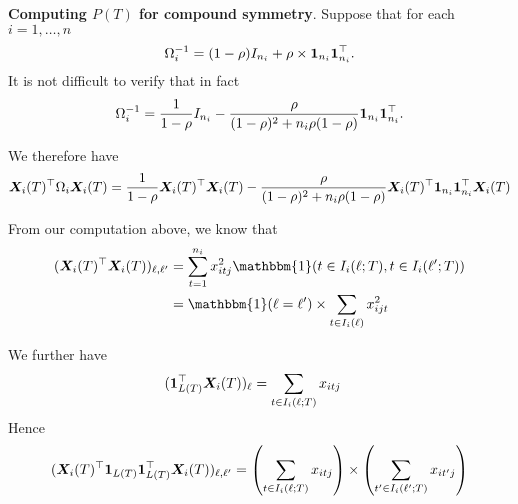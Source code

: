 \documentclass[11pt]{article}
\begin{document}
\textbf{Computing $P(T)$ for compound symmetry}. Suppose that for each $i = 1, \ldots, n$ 
$$
\Omega_{i}^{-1} = (1 - \rho)I_{n_{i}} + \rho \times \boldsymbol{1}_{n_{i}}\boldsymbol{1}_{n_{i}}^{\top}.
$$
It is not difficult to verify that in fact
$$
\Omega_{i}^{-1} = \frac{1}{1 - \rho}I_{n_{i}} - \frac{\rho}{(1 - \rho)^{2} + n_{i}\rho(1 - \rho)}\boldsymbol{1}_{n_{i}}\boldsymbol{1}_{n_{i}}^{\top}.
$$

We therefore have
$$
\bm{X}_{i}(T)^{\top}\Omega_{i}\bm{X}_{i}(T) = \frac{1}{1 - \rho}\bm{X}_{i}(T)^{\top}\bm{X}_{i}(T) - \frac{\rho}{(1 - \rho)^{2} + n_{i}\rho(1 - \rho)}\bm{X}_{i}(T)^{\top}\boldsymbol{1}_{n_{i}}\boldsymbol{1}_{n_{i}}^{\top}\bm{X}_{i}(T) 
$$

From our computation above, we know that
\begin{align*}
(\bX_{i}(T)^{\top}\bX_{i}(T))_{\ell,\ell'} &= \sum_{t = 1}^{n_{i}}{x_{itj}^{2}\mathbbm{1}(t \in I_{i}(\ell;T), t \in I_{i}(\ell';T))} \\
&= \mathbbm{1}(\ell = \ell') \times \sum_{t \in I_{i}(\ell)}{x_{ijt}^{2}}
\end{align*}

We further have
\begin{align*}
(\boldsymbol{1}_{L(T)}^{\top}\bm{X}_{i}(T))_{\ell} &= \sum_{t \in I_{i}(\ell;T)}{x_{itj}}
\end{align*}
Hence
$$
(\bm{X}_{i}(T)^{\top}\boldsymbol{1}_{L(T)}\boldsymbol{1}_{L(T)}^{\top}\bm{X}_{i}(T))_{\ell,\ell'} = \left(\sum_{t \in I_{i}(\ell;T)}{x_{itj}}\right) \times \left(\sum_{t' \in I_{i}(\ell';T)}{x_{it'j}}\right)
$$



\end{document}
